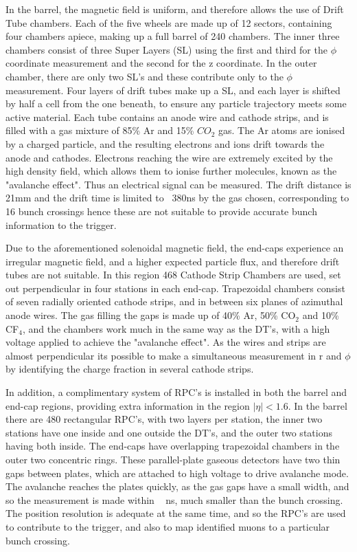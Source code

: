 In the barrel, the magnetic field is uniform, and therefore allows the use of Drift Tube chambers.  Each of the five wheels are made up of 12 sectors, containing four chambers apiece, making up a full barrel of 240 chambers. The inner three chambers consist of three Super Layers (SL) using the first and third for the $\phi$ coordinate measurement and the second for the z coordinate. In the outer chamber,  there are only two SL's and these contribute only to the $\phi$ measurement. Four layers of drift tubes make up a SL, and each layer is shifted by half a cell from the one beneath, to ensure any particle trajectory meets some active material. Each tube contains an anode wire and cathode strips, and is filled with a gas mixture of 85\% Ar and 15\% $CO_{2}$ gas. The Ar atoms are ionised by a charged particle, and the resulting electrons and ions drift towards the anode and cathodes. Electrons reaching the wire are extremely excited by the high density field, which allows them to ionise further molecules, known as the "avalanche effect". Thus an electrical signal can be measured. The drift distance is 21mm and the drift time is limited to ~380ns by the gas chosen, corresponding to 16 bunch crossings hence these are not suitable to provide accurate bunch information to the trigger.

Due to the aforementioned solenoidal magnetic field, the end-caps experience an irregular magnetic field, and a higher expected particle flux, and therefore drift tubes are not suitable. In this region 468 Cathode Strip Chambers are used, set out perpendicular  in four stations in each end-cap. Trapezoidal chambers consist of seven radially oriented cathode strips, and in between six planes of azimuthal anode wires. The gas filling the gaps is made up of 40\% Ar, 50\% CO$_{2}$ and 10\% CF$_{4}$, and the chambers work much in the same way as the DT's, with a high voltage applied to achieve the "avalanche effect". As the wires and strips are almost perpendicular its possible to make a simultaneous measurement in r and $\phi$ by identifying the charge fraction in several cathode strips. 

In addition, a complimentary system of RPC's is installed in both the barrel and end-cap regions, providing extra information in the region $|\eta| < 1.6$. In the barrel there are 480 rectangular RPC's, with two layers per station, the inner two stations have one inside and one outside the DT's, and the outer two stations having both inside. The end-caps have overlapping trapezoidal chambers in the outer two concentric rings. These parallel-plate gaseous detectors have two thin gaps between plates, which are attached to high voltage to drive avalanche mode. The avalanche reaches the plates quickly, as the gas gaps have a small width, and so the measurement is made within ~ ns, much smaller than the bunch crossing. The position resolution is adequate at the same time, and so the RPC's are used to contribute to the trigger, and also to map identified muons to a particular bunch crossing.

